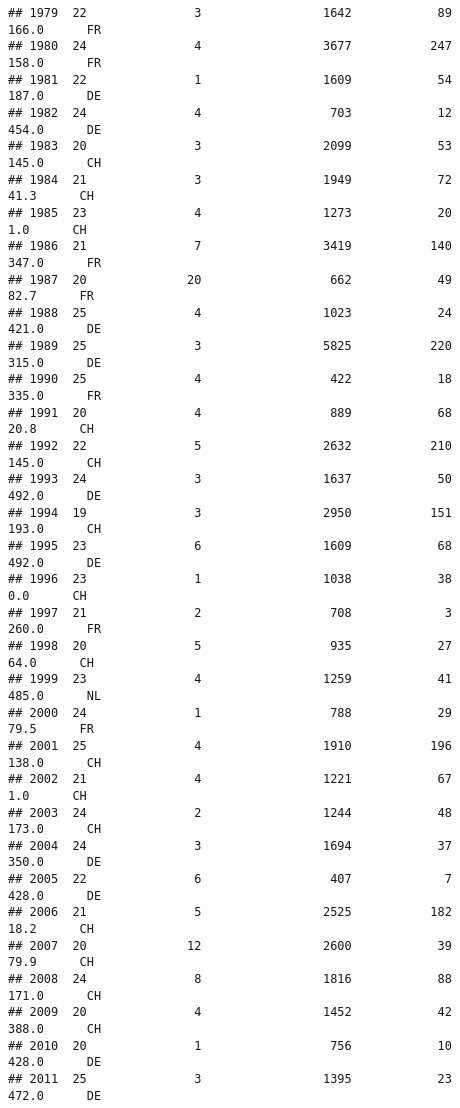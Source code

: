 \documentclass[
]{article}
\begin{document}
\begin{verbatim}
## 1979  22               3                 1642            89    166.0      FR
## 1980  24               4                 3677           247    158.0      FR
## 1981  22               1                 1609            54    187.0      DE
## 1982  24               4                  703            12    454.0      DE
## 1983  20               3                 2099            53    145.0      CH
## 1984  21               3                 1949            72     41.3      CH
## 1985  23               4                 1273            20      1.0      CH
## 1986  21               7                 3419           140    347.0      FR
## 1987  20              20                  662            49     82.7      FR
## 1988  25               4                 1023            24    421.0      DE
## 1989  25               3                 5825           220    315.0      DE
## 1990  25               4                  422            18    335.0      FR
## 1991  20               4                  889            68     20.8      CH
## 1992  22               5                 2632           210    145.0      CH
## 1993  24               3                 1637            50    492.0      DE
## 1994  19               3                 2950           151    193.0      CH
## 1995  23               6                 1609            68    492.0      DE
## 1996  23               1                 1038            38      0.0      CH
## 1997  21               2                  708             3    260.0      FR
## 1998  20               5                  935            27     64.0      CH
## 1999  23               4                 1259            41    485.0      NL
## 2000  24               1                  788            29     79.5      FR
## 2001  25               4                 1910           196    138.0      CH
## 2002  21               4                 1221            67      1.0      CH
## 2003  24               2                 1244            48    173.0      CH
## 2004  24               3                 1694            37    350.0      DE
## 2005  22               6                  407             7    428.0      DE
## 2006  21               5                 2525           182     18.2      CH
## 2007  20              12                 2600            39     79.9      CH
## 2008  24               8                 1816            88    171.0      CH
## 2009  20               4                 1452            42    388.0      CH
## 2010  20               1                  756            10    428.0      DE
## 2011  25               3                 1395            23    472.0      DE

\end{verbatim}
\end{document}
